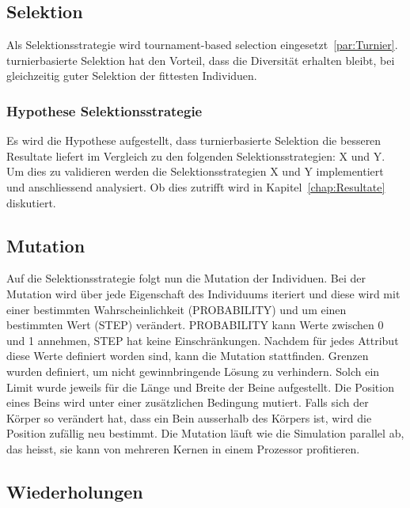     \subsection{Selektion\label{sec:Selektion}}

      Als Selektionsstrategie wird tournament-based selection eingesetzt~\ref{par:Turnier}.
      turnierbasierte Selektion hat den Vorteil, dass die Diversität erhalten bleibt,
      bei gleichzeitig guter Selektion der fittesten Individuen.

      \subsubsection{Hypothese Selektionsstrategie\label{sub:Hypothese Selektionsstrategie}}

        Es wird die Hypothese aufgestellt,
        dass turnierbasierte Selektion die besseren Resultate liefert im Vergleich zu den folgenden Selektionsstrategien: X und Y.
        Um dies zu validieren werden die Selektionsstrategien X und Y implementiert und anschliessend analysiert.
        Ob dies zutrifft wird in Kapitel~\ref{chap:Resultate} diskutiert.

    \subsection{Mutation\label{sec:Mutation}}

      Auf die Selektionsstrategie folgt nun die Mutation der Individuen.
      Bei der Mutation wird über jede Eigenschaft des Individuums iteriert und
      diese wird mit einer bestimmten Wahrscheinlichkeit (PROBABILITY) und um einen bestimmten Wert (STEP) verändert.
      PROBABILITY kann Werte zwischen 0 und 1 annehmen, STEP hat keine Einschränkungen.
      Nachdem für jedes Attribut diese Werte definiert worden sind, kann die Mutation stattfinden.
      Grenzen wurden definiert, um nicht gewinnbringende Lösung zu verhindern.
      Solch ein Limit wurde jeweils für die Länge und Breite der Beine aufgestellt.
      Die Position eines Beins wird unter einer zusätzlichen Bedingung mutiert. Falls sich der Körper so verändert hat,
      dass ein Bein ausserhalb des Körpers ist, wird die Position zufällig neu bestimmt.
      Die Mutation läuft wie die Simulation parallel ab, das heisst, sie kann von mehreren Kernen in einem Prozessor profitieren.

    \subsection{Wiederholungen}

